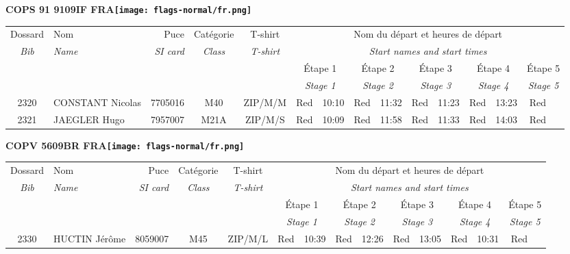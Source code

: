 \documentclass{report}
\begin{document}
\newpage
  \Huge \centering \bfseries COPS 91 9109IF FRA\normalfont \footnotesize \sffamily \hfill \texttt{[image: flags-normal/fr.png]} \newline 
  \begin{longtable}{|c|l|r|c|c|*{5}{cc|}}
    Dossard & Nom  & Puce    & Catégorie & T-shirt & \multicolumn{10}{c|}{Nom du départ et heures de départ} \\
    \itshape Bib     & \itshape Name & \itshape SI card & \itshape Class  & \itshape  T-shirt  & \multicolumn{10}{c|}{\itshape Start names and start times} \\
    \hline
    & & & & & \multicolumn{2}{c|}{Étape 1} & \multicolumn{2}{c|}{Étape 2} & \multicolumn{2}{c|}{Étape 3} & \multicolumn{2}{c|}{Étape 4} & \multicolumn{2}{c|}{Étape 5} \\
    & & & & & \multicolumn{2}{c|}{\itshape Stage 1} & \multicolumn{2}{c|}{\itshape Stage 2} & \multicolumn{2}{c|}{\itshape Stage 3} & \multicolumn{2}{c|}{\itshape Stage 4} & \multicolumn{2}{c|}{\itshape Stage 5} \\
    \hline
    2320 & CONSTANT Nicolas & 7705016 & M40 & ZIP/M/M & Red & 10:10 & Red & 11:32 & Red & 11:23 & Red & 13:23 & Red &  \\
    2321 & JAEGLER Hugo & 7957007 & M21A & ZIP/M/S & Red & 10:09 & Red & 11:58 & Red & 11:33 & Red & 14:03 & Red &  \\
  \end{longtable}
\newpage
  \Huge \centering \bfseries COPV 5609BR FRA\normalfont \footnotesize \sffamily \hfill \texttt{[image: flags-normal/fr.png]} \newline 
  \begin{longtable}{|c|l|r|c|c|*{5}{cc|}}
    Dossard & Nom  & Puce    & Catégorie & T-shirt & \multicolumn{10}{c|}{Nom du départ et heures de départ} \\
    \itshape Bib     & \itshape Name & \itshape SI card & \itshape Class  & \itshape  T-shirt  & \multicolumn{10}{c|}{\itshape Start names and start times} \\
    \hline
    & & & & & \multicolumn{2}{c|}{Étape 1} & \multicolumn{2}{c|}{Étape 2} & \multicolumn{2}{c|}{Étape 3} & \multicolumn{2}{c|}{Étape 4} & \multicolumn{2}{c|}{Étape 5} \\
    & & & & & \multicolumn{2}{c|}{\itshape Stage 1} & \multicolumn{2}{c|}{\itshape Stage 2} & \multicolumn{2}{c|}{\itshape Stage 3} & \multicolumn{2}{c|}{\itshape Stage 4} & \multicolumn{2}{c|}{\itshape Stage 5} \\
    \hline
    2330 & HUCTIN Jérôme & 8059007 & M45 & ZIP/M/L & Red & 10:39 & Red & 12:26 & Red & 13:05 & Red & 10:31 & Red &  \\
  \end{longtable}
\end{document}
